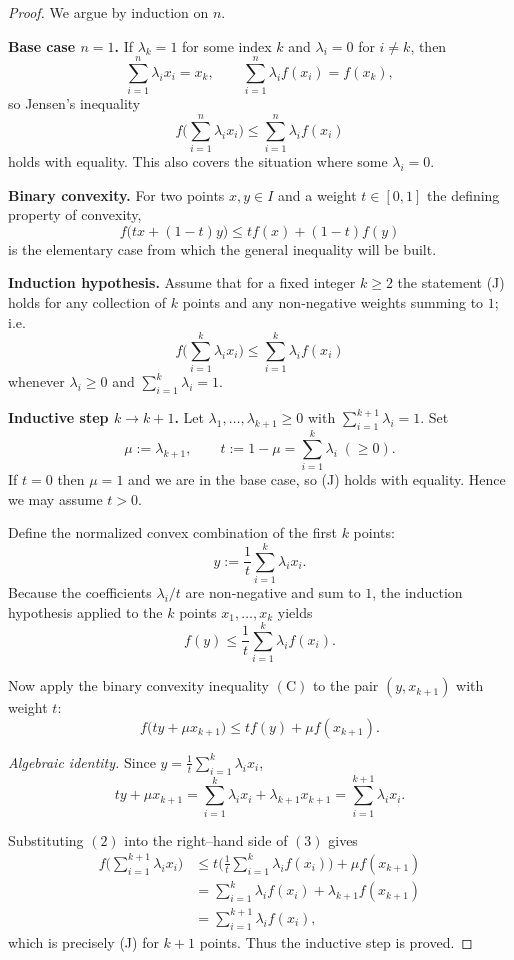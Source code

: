 \begin{proof}
We argue by induction on \(n\).

\textbf{Base case \(n=1\).}  
If \(\lambda_{k}=1\) for some index \(k\) and \(\lambda_{i}=0\) for \(i\neq k\), then
\[
\sum_{i=1}^{n}\lambda_{i}x_{i}=x_{k},\qquad 
\sum_{i=1}^{n}\lambda_{i}f(x_{i})=f(x_{k}),
\]
so Jensen’s inequality
\[
f\!\Big(\sum_{i=1}^{n}\lambda_{i}x_{i}\Big)\le\sum_{i=1}^{n}\lambda_{i}f(x_{i}) \tag{J}
\]
holds with equality. This also covers the situation where some \(\lambda_{i}=0\).

\textbf{Binary convexity.}  
For two points \(x,y\in I\) and a weight \(t\in[0,1]\) the defining property of convexity,
\[
f\big(t x+(1-t) y\big)\le t f(x)+(1-t)f(y) \tag{C}
\]
is the elementary case from which the general inequality will be built.

\textbf{Induction hypothesis.}  
Assume that for a fixed integer \(k\ge 2\) the statement (J) holds for any collection of
\(k\) points and any non‑negative weights summing to \(1\); i.e.
\[
f\!\Big(\sum_{i=1}^{k}\lambda_{i}x_{i}\Big)\le\sum_{i=1}^{k}\lambda_{i}f(x_{i}) \tag{IH\(_k\)}
\]
whenever \(\lambda_{i}\ge0\) and \(\sum_{i=1}^{k}\lambda_{i}=1\).

\textbf{Inductive step \(k\to k+1\).}  
Let \(\lambda_{1},\dots ,\lambda_{k+1}\ge0\) with \(\sum_{i=1}^{k+1}\lambda_{i}=1\).  
Set
\[
\mu:=\lambda_{k+1},\qquad t:=1-\mu=\sum_{i=1}^{k}\lambda_{i}\;( \ge 0).
\]
If \(t=0\) then \(\mu=1\) and we are in the base case, so (J) holds with equality.
Hence we may assume \(t>0\).

Define the normalized convex combination of the first \(k\) points:
\[
y:=\frac{1}{t}\sum_{i=1}^{k}\lambda_{i}x_{i}.
\]
Because the coefficients \(\lambda_{i}/t\) are non‑negative and sum to \(1\), the induction
hypothesis applied to the \(k\) points \(x_{1},\dots ,x_{k}\) yields
\[
f(y)\le\frac{1}{t}\sum_{i=1}^{k}\lambda_{i}f(x_{i}). \tag{2}
\]

Now apply the binary convexity inequality \((\text{C})\) to the pair \((y,x_{k+1})\) with
weight \(t\):
\[
f\big(t y+\mu x_{k+1}\big)\le t f(y)+\mu f(x_{k+1}). \tag{3}
\]

\textit{Algebraic identity.}  
Since \(y=\frac{1}{t}\sum_{i=1}^{k}\lambda_{i}x_{i}\),
\[
t y+\mu x_{k+1}= \sum_{i=1}^{k}\lambda_{i}x_{i}+\lambda_{k+1}x_{k+1}
= \sum_{i=1}^{k+1}\lambda_{i}x_{i}. \tag{4}
\]

Substituting \((2)\) into the right–hand side of \((3)\) gives
\[
\begin{aligned}
f\!\Big(\sum_{i=1}^{k+1}\lambda_{i}x_{i}\Big)
&\le t\Big(\frac{1}{t}\sum_{i=1}^{k}\lambda_{i}f(x_{i})\Big)+\mu f(x_{k+1}) \\
&= \sum_{i=1}^{k}\lambda_{i}f(x_{i})+\lambda_{k+1}f(x_{k+1}) \\
&= \sum_{i=1}^{k+1}\lambda_{i}f(x_{i}),
\end{aligned}
\]
which is precisely (J) for \(k+1\) points. Thus the inductive step is proved.


\end{proof}

